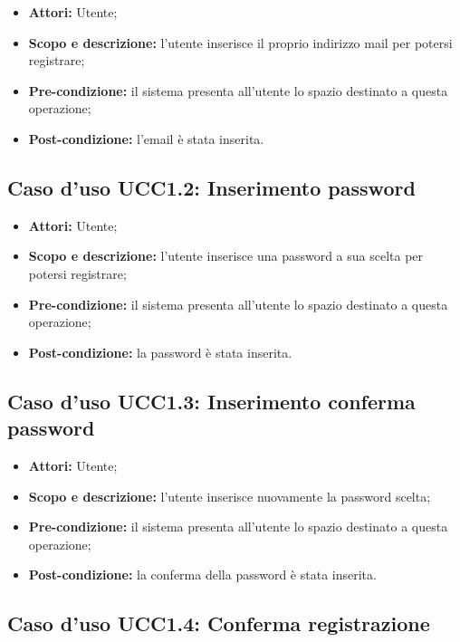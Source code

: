 \begin{itemize}
\item \textbf{Attori:} Utente;
\item \textbf{Scopo e descrizione:} l'utente inserisce il proprio indirizzo mail per potersi registrare;
\item \textbf{Pre-condizione:} il sistema presenta all'utente lo spazio destinato a questa operazione;
\item \textbf{Post-condizione:} l'email è stata inserita.
\end{itemize}

\subsection{Caso d'uso UCC1.2: Inserimento password}

\begin{itemize}
\item \textbf{Attori:} Utente;
\item \textbf{Scopo e descrizione:} l'utente inserisce una password a sua scelta per potersi registrare;
\item \textbf{Pre-condizione:} il sistema presenta all'utente lo spazio destinato a questa operazione;
\item \textbf{Post-condizione:} la password è stata inserita.
\end{itemize}

\subsection{Caso d'uso UCC1.3: Inserimento conferma password}

\begin{itemize}
\item \textbf{Attori:} Utente;
\item \textbf{Scopo e descrizione:} l'utente inserisce nuovamente la password scelta;
\item \textbf{Pre-condizione:} il sistema presenta all'utente lo spazio destinato a questa operazione;
\item \textbf{Post-condizione:} la conferma della password è stata inserita.
\end{itemize}

\subsection{Caso d'uso UCC1.4: Conferma registrazione}

